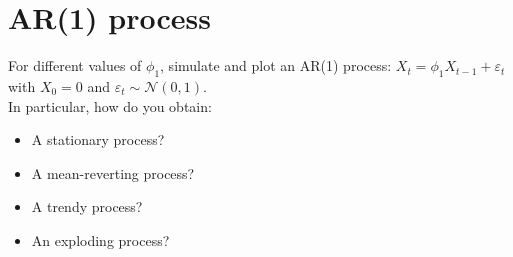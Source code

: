 \section{AR(1) process}

For different values of $\phi_1$, simulate and plot an AR(1) process: $X_t = \phi_1 X_{t-1} + \varepsilon_t$ with $X_0 = 0$ and $\varepsilon_t \sim \mathcal{N}(0, 1)$.\\

\noindent In particular, how do you obtain:

\begin{itemize}
    \item A stationary process?
    \item A mean-reverting process?
    \item A trendy process?
    \item An exploding process?
\end{itemize}

